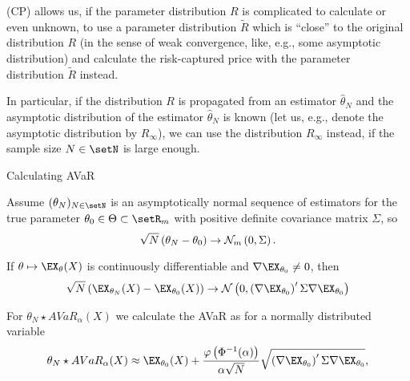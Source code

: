 


	(CP) allows us, if the parameter distribution $R$ is complicated to calculate or even unknown, to use a parameter distribution $\tilde{R}$ which is ``close'' to the original distribution $R$ (in the sense of weak convergence, like, e.g., some asymptotic distribution) and calculate the risk-captured price with the parameter distribution $\tilde{R}$ instead.

	In particular, if the distribution $R$ is propagated from an estimator $\hat{\theta}_N$ and the asymptotic distribution of the estimator $\hat{\theta}_N$ is known (let us, e.g., denote the asymptotic distribution by $R_\infty$), we can use the distribution $R_\infty$ instead, if the sample size $N\in\setN$ is large enough.






{Calculating AVaR}






	Assume $(\theta_N)_{N \in \setN}$ is an asymptotically normal sequence of estimators for the true parameter $\theta_0 \in \Theta \subset \setR_m$  with positive definite covariance matrix $\Sigma$, so
$$
\sqrt{N}\left(\theta_N -\theta_0\right) \rightarrow {\cal N}_m \left(0,\Sigma\right).
$$

	If $\theta \mapsto \EX_\theta(X)$ is continuously differentiable and $\nabla  \EX_{\theta_0} \not =0$, then
$$
\sqrt{N}\left(\EX_{\theta_N}(X)-\EX_{\theta_0}(X)\right) \rightarrow {\cal N}\left(0, \left(\nabla \EX_{\theta_0}\right)' \Sigma \nabla \EX_{\theta_0}\right)
$$

	For $\theta_N \star AVaR_\alpha(X)$ we calculate the AVaR as for a normally distributed variable
$$
\theta_N \star AVaR_\alpha(X) \approx \EX_{\theta_0}(X) + \frac{\varphi\left(\Phi^{-1}(\alpha)\right)}{\alpha\sqrt{N}} \sqrt{\left(\nabla \EX_{\theta_0}\right)' \Sigma \nabla \EX_{\theta_0}},
$$





